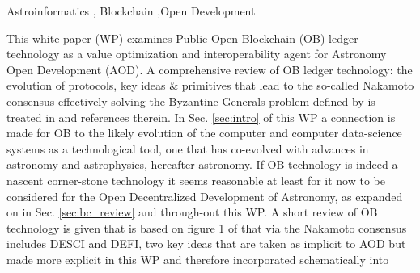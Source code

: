 \documentclass[final,5p,times,twocolumn,authoryear]{elsarticle}
\begin{document}
\begin{frontmatter}



\begin{keyword}
   Astroinformatics \sep 
Blockchain \sep Open Development
\end{keyword}
\end{frontmatter}

This white paper (WP) examines Public Open Blockchain (OB) ledger technology as a value optimization and interoperability agent for Astronomy Open Development (AOD). A comprehensive review of OB ledger technology: the evolution of protocols, key ideas \& primitives that lead to the so-called Nakamoto consensus effectively solving the Byzantine Generals problem defined by \cite{Lamport1982TheBG} is treated in  \cite{arvindandclark2017} and references therein. In Sec. \ref{sec:intro} of this WP a connection is made for OB to the likely evolution of the computer and computer data-science systems as a technological tool, one that has co-evolved with advances in astronomy and astrophysics, hereafter astronomy. If OB technology is indeed a nascent corner-stone technology it seems reasonable at least for it  now to be considered for the Open Decentralized Development of Astronomy, as expanded on in Sec. \ref{sec:bc_review} and through-out this WP.  A short review of OB technology is given that is based on figure 1 of \cite{arvindandclark2017} that via the Nakamoto consensus includes DESCI and DEFI, two key ideas that are taken as implicit to AOD but made more explicit in this WP and therefore incorporated schematically into 
\end{document}

